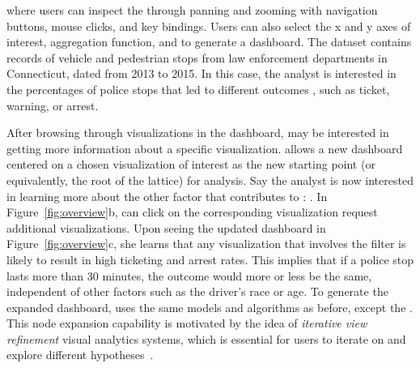 where users can inspect the 
through panning and zooming with navigation buttons,
mouse clicks, and key bindings.
Users can also select the x and y axes of interest,
aggregation function, and 
to generate a dashboard.
The dataset contains records of vehicle and pedestrian stops from law enforcement departments in Connecticut, dated from 2013 to 2015. In this case, the analyst is interested in the percentages of police stops  that led to different outcomes , such as ticket, warning, or arrest.

After browsing through visualizations in the dashboard,
 may be interested in getting more information
about a specific visualization.
\system allows  
a new dashboard centered on a chosen visualization
of interest as the new starting point
(or equivalently, the root of the lattice)
for analysis.
Say the analyst is now interested in learning more
about the other factor that contributes to :
.
In Figure~\ref{fig:overview}b, 
can click on the corresponding visualization
 request additional visualizations.
Upon seeing the updated dashboard in Figure~\ref{fig:overview}c,
she learns that any visualization
that involves the 
filter is likely to result in high ticketing and arrest rates.
This implies that if a police stop lasts more than 30 minutes,
the outcome would more or less be the same,
independent of other factors such as the driver's race or age.
To generate the expanded dashboard, \system uses the same models
and algorithms as before,
except the .
This node expansion capability is motivated
by the idea of \textit{iterative view refinement}
 visual analytics systems,
which is essential for users to iterate on and
explore different hypotheses~\cite{Hoque2017,Wongsuphasawat2016}.
